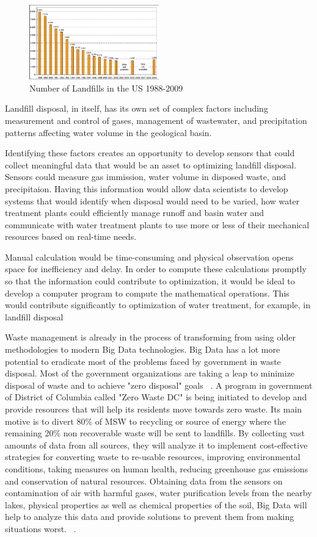 \documentclass[sigconf]{acmart}
\begin{document}
\begin{figure}[ht!]
  \includegraphics[width=0.5\textwidth]{landfills.png}
  \caption{Number of Landfills in the US 1988-2009}
\end{figure}

Landfill disposal, in itself, has its own set of complex factors including measurement and control of gases, management of wastewater, and precipitation patterns affecting water volume in the geological basin.  

Identifying these factors creates an opportunity to develop sensors that could collect meaningful data that would be an asset to optimizing landfill disposal.  Sensors could measure gas immission, water volume in disposed waste, and precipitaion.  Having this information would allow data scientists to develop systems that would identify when disposal would need to be varied, how water treatment plants could efficiently manage runoff and basin water and communicate with water treatment plants to use more or less of their mechanical resources based on real-time needs. 

 Manual calculation would be time-consuming and physical observation opens space for inefficiency and delay.  In order to compute these calculations promptly so that the information could contribute to optimization, it would be ideal to develop a computer program to compute the mathematical operations.  This would contribute significantly to optimization of water treatment, for example, in landfill disposal ~\cite{akbarpour2016}

Waste management is already in the process of transforming from using older methodologies to modern Big Data technologies. Big Data has a lot more potential to eradicate most of the problems faced by government in waste disposal. Most of the government organizations are taking a leap to minimize disposal of waste and to achieve "zero disposal" goals~\cite{rosengren2017} . A program in government of District of Columbia called "Zero Waste DC" is being initiated to develop and provide resources that will help its residents move towards zero waste. Its main motive is to divert 80\% of MSW to recycling or source of energy where the remaining 20\% non recoverable waste will be sent to landfills. By collecting vast amounts of data from all sources, they will analyze it to implement cost-effective strategies for converting waste to re-usable resources, improving environmental conditions, taking measures on human health, reducing greenhouse gas emissions and conservation of natural resources. Obtaining data from the sensors on contamination of air with harmful gases, water purification levels from the nearby lakes, physical properties as well as chemical properties of the soil, Big Data will help to analyze this data and provide solutions to prevent them from making situations worst. ~\cite{rosengren2017}.
\end{document}
